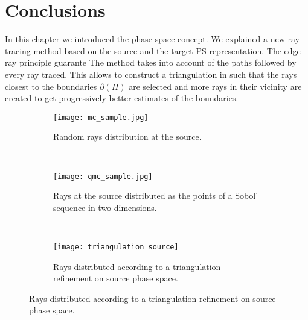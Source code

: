 \section{Conclusions}
In this chapter we introduced the phase space concept.
We explained a new ray tracing method based on the source and the target PS representation.
The edge-ray principle guarante
The method takes into account of the paths followed by every ray traced.
This allows to construct a triangulation in  such that the rays closest to the boundaries $\partial$$(\Pi)$
are selected and more rays in their vicinity are created to get progressively better estimates of the boundaries.\\ \indent

\begin{figure}[h]
 \begin{subfigure}[t]{\textwidth}
\centering
    \texttt{[image: mc\_sample.jpg]}
    \caption{Random rays distribution at the source.}
    \label{fig:mc_sample}
\end{subfigure}
\hfill
\\
\begin{subfigure}[t]{\textwidth}
\centering
    \texttt{[image: qmc\_sample.jpg]}
    \caption{Rays at the source distributed as the points of a Sobol' sequence in two-dimensions.}
    \label{fig:qmc_sample}
\end{subfigure}
\\
\begin{subfigure}[t]{\textwidth}
\centering
\texttt{[image: triangulation\_source]}
\caption{Rays distributed according to a triangulation refinement
on source phase space.}
\label{fig:mc_sample}
\end{subfigure}
\end{figure}

